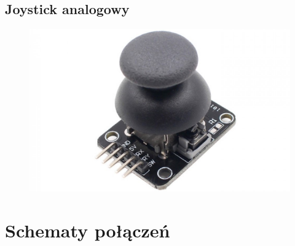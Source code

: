 \documentclass[12pt,notitlepage]{article}
\begin{document}
\subsection{Joystick analogowy}
\begin{figure}[h!]
  \includegraphics[width=\textwidth]{joystick.jpg}
  \center
  \label{fig:joystick}
\end{figure}
\newpage

\section{Schematy połączeń}
\end{document}
